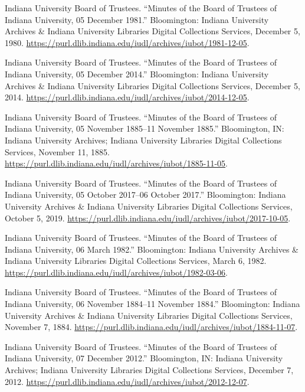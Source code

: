 \documentclass[
  american,
  letterpaper,
]{scrreprt}
\newlength{\cslhangindent}
\newenvironment{CSLReferences}[2] %
 {\begin{list}{}{%
  \setlength{\itemindent}{0pt}
  \setlength{\leftmargin}{0pt}
  \setlength{\parsep}{0pt}
  \ifodd #1
   \setlength{\leftmargin}{\cslhangindent}
   \setlength{\itemindent}{-1\cslhangindent}
  \fi
  \setlength{\itemsep}{#2\baselineskip}}}
 {\end{list}}
\begin{document}
\begin{CSLReferences}{1}{0}
Indiana University Board of Trustees. {``Minutes of the Board of
Trustees of Indiana University, 05 December 1981.''} Bloomington:
Indiana University Archives \& Indiana University Libraries Digital
Collections Services, December 5, 1980.
\url{https://purl.dlib.indiana.edu/iudl/archives/iubot/1981-12-05}.

Indiana University Board of Trustees. {``Minutes of the Board of
Trustees of Indiana University, 05 December 2014.''} Bloomington:
Indiana University Archives \& Indiana University Libraries Digital
Collections Services, December 5, 2014.
\url{https://purl.dlib.indiana.edu/iudl/archives/iubot/2014-12-05}.

Indiana University Board of Trustees. {``Minutes of the Board of
Trustees of Indiana University, 05 November 1885--11 November 1885.''}
Bloomington, IN: Indiana University Archives; Indiana University
Libraries Digital Collections Services, November 11, 1885.
\url{https://purl.dlib.indiana.edu/iudl/archives/iubot/1885-11-05}.

Indiana University Board of Trustees. {``Minutes of the Board of
Trustees of Indiana University, 05 October 2017--06 October 2017.''}
Bloomington: Indiana University Archives \& Indiana University Libraries
Digital Collections Services, October 5, 2019.
\url{https://purl.dlib.indiana.edu/iudl/archives/iubot/2017-10-05}.

Indiana University Board of Trustees. {``Minutes of the Board of
Trustees of Indiana University, 06 March 1982.''} Bloomington: Indiana
University Archives \& Indiana University Libraries Digital Collections
Services, March 6, 1982.
\url{https://purl.dlib.indiana.edu/iudl/archives/iubot/1982-03-06}.

Indiana University Board of Trustees. {``Minutes of the Board of
Trustees of Indiana University, 06 November 1884--11 November 1884.''}
Bloomington: Indiana University Archives \& Indiana University Libraries
Digital Collections Services, November 7, 1884.
\url{https://purl.dlib.indiana.edu/iudl/archives/iubot/1884-11-07}.

Indiana University Board of Trustees. {``Minutes of the Board of
Trustees of Indiana University, 07 December 2012.''} Bloomington, IN:
Indiana University Archives; Indiana University Libraries Digital
Collections Services, December 7, 2012.
\url{https://purl.dlib.indiana.edu/iudl/archives/iubot/2012-12-07}.


\end{CSLReferences}
\end{document}
